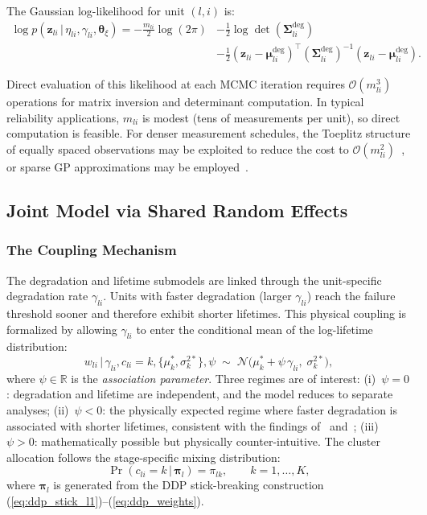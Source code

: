 \documentclass[a4paper,fleqn,longmktitle]{cas-sc}
\newcommand{\given}{\,|\,}
\newcommand{\normal}{\mathcal{N}}
\newcommand{\R}{\mathbb{R}}
\begin{document}
The Gaussian log-likelihood for unit $(l,i)$ is:
\begin{equation}\label{eq:degrad_loglik}
    \begin{aligned}
        \log p(\bm{z}_{li} \given \eta_{li}, \gamma_{li}, \bm{\theta}_\xi)
        = -\frac{m_{li}}{2}\log(2\pi)
        &- \frac{1}{2}\log\det(\bm{\Sigma}_{li}^{\text{deg}}) \\
        &- \frac{1}{2}(\bm{z}_{li} - \bm{\mu}_{li}^{\text{deg}})^{\top}
           (\bm{\Sigma}_{li}^{\text{deg}})^{-1}
           (\bm{z}_{li} - \bm{\mu}_{li}^{\text{deg}}).
    \end{aligned}
\end{equation}

Direct evaluation of this likelihood at each MCMC iteration requires $\mathcal{O}(m_{li}^3)$ operations for matrix inversion and determinant computation. In typical reliability applications, $m_{li}$ is modest (tens of measurements per unit), so direct computation is feasible. For denser measurement schedules, the Toeplitz structure of equally spaced observations may be exploited to reduce the cost to $\mathcal{O}(m_{li}^2)$~\cite{Zhang2005}, or sparse GP approximations may be employed~\cite{Quinonero2005}.

\subsection{Joint Model via Shared Random Effects}
\label{sec:joint}

\subsubsection{The Coupling Mechanism}

The degradation and lifetime submodels are linked through the unit-specific degradation rate $\gamma_{li}$. Units with faster degradation (larger $\gamma_{li}$) reach the failure threshold sooner and therefore exhibit shorter lifetimes. This physical coupling is formalized by allowing $\gamma_{li}$ to enter the conditional mean of the log-lifetime distribution:
\begin{equation}\label{eq:joint_lifetime}
    w_{li} \given \gamma_{li}, c_{li} = k, \{\mu_k^*, \sigma_k^{2*}\}, \psi \;\sim\;
    \normal\!\bigl(\mu_k^* + \psi\,\gamma_{li}, \; \sigma_k^{2*}\bigr),
\end{equation}
where $\psi \in \R$ is the \emph{association parameter}. Three regimes are of interest: (i)~$\psi = 0$: degradation and lifetime are independent, and the model reduces to separate analyses; (ii)~$\psi < 0$: the physically expected regime where faster degradation is associated with shorter lifetimes, consistent with the findings of~\cite{Fu2024} and~\cite{Fard2025}; (iii)~$\psi > 0$: mathematically possible but physically counter-intuitive. The cluster allocation follows the stage-specific mixing distribution:
\begin{equation}\label{eq:cluster_alloc}
    \Pr(c_{li} = k \given \bm{\pi}_l) = \pi_{lk}, \qquad k = 1, \ldots, K,
\end{equation}
where $\bm{\pi}_l$ is generated from the DDP stick-breaking construction (\ref{eq:ddp_stick_l1})--(\ref{eq:ddp_weights}).
\end{document}
